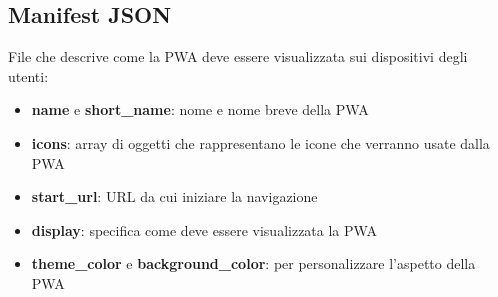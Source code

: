 \documentclass[12pt, a4paper]{article}
\begin{document}
\subsection{Manifest JSON}
File che descrive come la PWA deve essere visualizzata sui dispositivi degli utenti:
\begin{itemize}
    \item \textbf{name} e \textbf{short\_name}: nome e nome breve della PWA
    \item \textbf{icons}: array di oggetti che rappresentano le icone che verranno usate dalla PWA
    \item \textbf{start\_url}: URL da cui iniziare la navigazione
    \item \textbf{display}: specifica come deve essere visualizzata la PWA
    \item \textbf{theme\_color} e \textbf{background\_color}: per personalizzare l'aspetto della PWA
\end{itemize}
\end{document}
